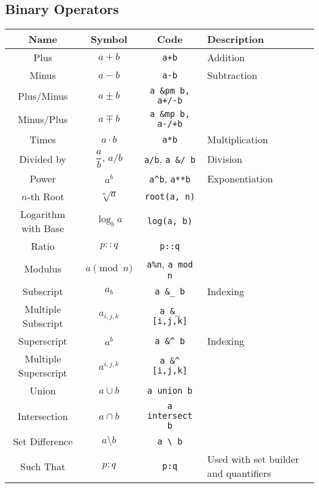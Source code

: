 \documentclass{article}
\begin{document}
  \newpage

  \subsection{Binary Operators} %
  \label{sub:binary_ops}
  \begin{table}[!h]
    \centering
    \begin{tabular}{|c|c|c|l|}
      \hline
      \textbf{Name} & \textbf{Symbol} & \textbf{Code} & \textbf{Description} \\
      \hline\hline

      Plus & \( a + b \) & \texttt{a+b} & Addition \\
      Minus & \( a - b \) & \texttt{a-b} & Subtraction \\
      Plus/Minus & \( a \pm b \) & \texttt{a \&pm b, a+/-b} & \\
      Minus/Plus & \( a \mp b \) & \texttt{a \&mp b, a-/+b} & \\
      Times & \( a \cdot b \) & \texttt{a*b} & Multiplication \\
      Divided by & \( \dfrac{a}{b} \), \( a/b \) & \texttt{a/b}, \texttt{a \&/ b} & Division \\
      Power & \( a^b \) & \texttt{a\^{}b}, \texttt{a**b} & Exponentiation \\
      \( n \)-th Root & \( \sqrt[n]{a} \) & \texttt{root(a, n)} & \\
      Logarithm with Base & \( \log_b{a} \) & \texttt{log(a, b)} & \\
      Ratio & \( p :: q \) & \texttt{p::q} & \\
      Modulus & \( a \pmod{n} \) & \texttt{a\%n}, \texttt{a mod n} & \\
      \hline
      Subscript & \( a_b \) & \texttt{a \&\_ b} & Indexing \\
      Multiple Subscript & \( a_{i,j,k} \) & \texttt{a \&\_ [i,j,k]} & \\
      Superscript & \( a^b \) & \texttt{a \&\^{} b} & Indexing \\
      Multiple Superscript & \( a^{i,j,k} \) & \texttt{a \&\^{} [i,j,k]} & \\
      \hline
      Union & \( a \cup b \) & \texttt{a union b} & \\
      Intersection & \( a \cap b \) & \texttt{a intersect b} & \\
      Set Difference & \( a \setminus b \) & \texttt{a \textbackslash \ b} & \\
      Such That & \( p : q \) & \texttt{p:q} & Used with set builder and quantifiers \\

\end{tabular}
\end{table}
\end{document}
